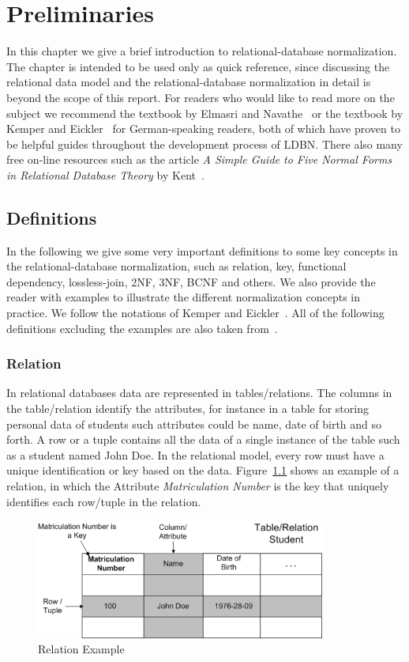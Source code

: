 \chapter{Preliminaries}
\label{chap:preliminaries}
In this chapter we give a brief introduction to relational-database
normalization. The chapter is intended to be used only as quick reference,
since discussing the relational data model and the relational-database normalization
in detail is beyond the scope of this report. For readers who would like to read
more on the subject we recommend the textbook by Elmasri and Navathe~\cite{bdb1} or
the textbook by Kemper and Eickler~\cite{bdb2} for German-speaking readers, both of which have 
proven to be helpful guides throughout the development process of LDBN. There also
many free on-line resources such as the article 
\textit{A Simple Guide to Five Normal Forms in Relational Database Theory}
by Kent~\cite{p7}.  

\section{Definitions}
In the following we give some very important definitions to some key
concepts in the relational-database
normalization, such as relation, key, functional dependency, lossless-join, 
2NF, 3NF, BCNF and others. We also provide the reader with examples to illustrate the 
different normalization concepts in practice. We follow the notations 
of Kemper and Eickler~\cite{bdb2}.
All of the following definitions excluding the examples are also taken from~\cite[Chapter 6]{bdb2}.  

\subsection{Relation}
In relational databases data are represented in tables/relations. 
The columns in the table/relation identify the attributes, for instance
in a table for storing personal data of students such attributes could be
name, date of birth and so forth. A row or a tuple contains all the data of a single 
instance of the table such as a student named John Doe.
In the relational model, every row must have a unique identification or 
key based on the data. Figure~\ref{fig:rmodel} shows an example of a relation, in which 
the Attribute \textit{Matriculation Number} is the key that uniquely identifies each row/tuple in the relation.

\begin{figure}[h]
  \begin{center}
    \includegraphics[width=0.85\textwidth]{./img/rmodel01.png}
    \caption{Relation Example}
    \label{fig:rmodel}
  \end{center}
\end{figure}

